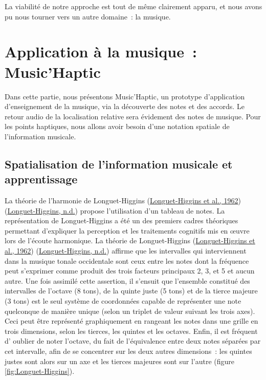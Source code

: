 \documentclass[
]{book}
\begin{document}
La viabilité de notre approche est tout de même clairement apparu, et nous
avons pu nous tourner vers un autre domaine~: la musique.

\hypertarget{application-uxe0-la-musique-musichaptic}{%
\section{Application à la musique~: Music'Haptic}\label{application-uxe0-la-musique-musichaptic}}

Dans cette partie, nous présentons Music'Haptic, un prototype
d'application d'enseignement de la musique, via la découverte des notes et
des accords. Le retour audio de la localisation relative sera évidement des
notes de musique. Pour les points haptiques, nous allons avoir besoin d'une
notation spatiale de l'information musicale.

\hypertarget{spatialisation-de-linformation-musicale-et-apprentissage}{%
\subsection{Spatialisation de l'information musicale et apprentissage}\label{spatialisation-de-linformation-musicale-et-apprentissage}}

La théorie de l'harmonie de Longuet-Higgins (\protect\hyperlink{ref-longuet1962letter}{Longuet-Higgins et al., 1962})
(\protect\hyperlink{ref-longuet2319626}{Longuet-Higgins, n.d.}) propose
l'utilisation d'un tableau de notes. La représentation de Longuet-Higgins a
été un des premiers cadres théoriques permettant d'expliquer la perception et
les traitements cognitifs mis en œuvre lors de l'écoute harmonique. La
théorie de Longuet-Higgins (\protect\hyperlink{ref-longuet1962letter}{Longuet-Higgins et al., 1962}) (\protect\hyperlink{ref-longuet2319626}{Longuet-Higgins, n.d.}) affirme que
les intervalles qui interviennent dans la musique tonale occidentale sont ceux
entre les notes dont la fréquence peut s'exprimer comme produit des trois
facteurs principaux 2, 3, et 5 et aucun autre. Une fois assimilé cette
assertion, il s'ensuit que l'ensemble constitué des intervalles de l'octave
(8 tons), de la quinte juste (5 tons) et de la tierce majeure (3 tons) est le
seul système de coordonnées capable de représenter une note quelconque de
manière unique (selon un triplet de valeur suivant les trois axes). Ceci peut
être représenté graphiquement en rangeant les notes dans une grille en trois
dimensions, selon les tierces, les quintes et les octaves. Enfin, il est
fréquent d' oublier de noter l'octave, du fait de l'équivalence entre deux
notes séparées par cet intervalle, afin de se concentrer sur les deux autres
dimensions~: les quintes justes sont alors sur un axe et les tierces majeures
sont sur l'autre (figure \ref{fig:Longuet-Higgins}).
\end{document}
